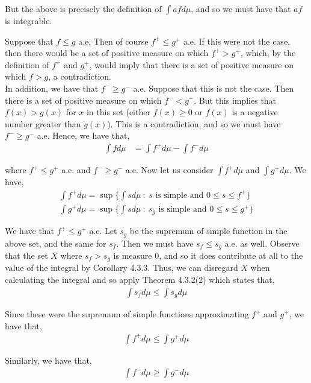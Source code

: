 \documentclass[12pt]{article}
\newenvironment{problem}[2][Problem]{\begin{trivlist}
\item[\hskip \labelsep {\bfseries #1}\hskip \labelsep {\bfseries #2.}]}{\end{trivlist}}
\begin{document}
But the above is precisely the definition of $\int af d\mu$, and so we must have that $af$ is integrable.

\begin{problem}{5}
\end{problem}

Suppose that $f \leq g$ a.e. Then of course $f^+ \leq g^+$ a.e. If this were not the case, then there would be a set of positive measure on which $f^+ > g^+$, which, by the definition of $f^+$ and $g^+$, would imply that there is a set of positive measure on which $f > g$, a contradiction.\\

In addition, we have that $f^- \geq g^-$ a.e. Suppose that this is not the case. Then there is a set of positive measure on which $f^- < g^-$. But this implies that $f(x) > g(x)$ for $x$ in this set (either $f(x) \geq 0$ or $f(x)$ is a negative number greater than $g(x)$). This is a contradiction, and so we must have $f^- \geq g^-$ a.e. Hence, we have that,
\begin{align*}
\int f d\mu &= \int f^+ d\mu - \int f^- d\mu 
\end{align*}

where $f^+ \leq g^+$ a.e. and $f^- \geq g^-$ a.e. Now let us consider $\int f^+ d\mu$ and $\int g^+ d\mu$. We have,
\begin{align*}
\int f^+ d\mu = \sup \{\int s d\mu \ : \ s \text{ is simple and } 0 \leq s \leq f^+\}\\
\int g^+ d\mu = \sup \{\int s d\mu \ : \ s_g \text{ is simple and } 0 \leq s \leq g^+\}
\end{align*}

We have that $f^+ \leq g^+$ a.e. Let $s_g$ be the supremum of simple function in the above set, and the same for $s_f$. Then we must have $s_f \leq s_g$ a.e. as well. Observe that the set $X$ where $s_f > s_g$ is measure $0$, and so it does contribute at all to the value of the integral by Corollary 4.3.3. Thus, we can disregard $X$ when calculating the integral and so apply Theorem 4.3.2(2) which states that,
\begin{align*}
\int s_f d\mu \leq \int s_g d\mu
\end{align*}

Since these were the supremum of simple functions approximating $f^+$ and $g^+$, we have that,
\begin{align*}
\int f^+ d\mu \leq \int g^+ d\mu
\end{align*}

Similarly, we have that,
\begin{align*}
\int f^- d\mu \geq \int g^- d\mu
\end{align*}
\end{document}
